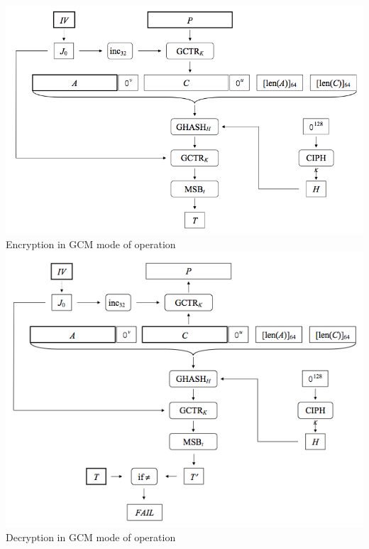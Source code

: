 \vspace{1cm}
\begin{center}
\includegraphics[scale=0.4]{images/aesgcmenc}\\

\vspace{1cm}
Encryption in GCM mode of operation\\
\clearpage
\includegraphics[scale=0.6]{images/aesgcmdec}\\

\vspace{0.5cm}
Decryption in GCM mode of operation\\


\end{center}
